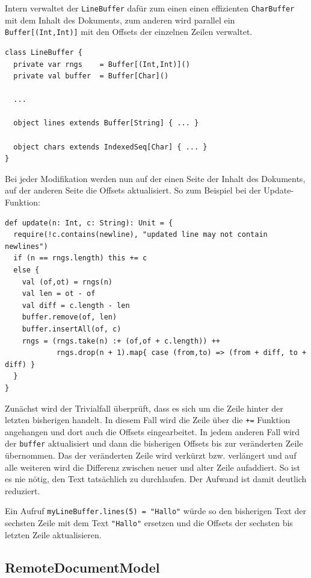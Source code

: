 Intern verwaltet der \texttt{LineBuffer} dafür zum einen einen effizienten \texttt{CharBuffer} mit
dem Inhalt des Dokuments, zum anderen wird parallel ein \texttt{Buffer[(Int,Int)]} mit den Offsets
der einzelnen Zeilen verwaltet.

\begin{lstlisting}
class LineBuffer {
  private var rngs    = Buffer[(Int,Int)]()  
  private val buffer  = Buffer[Char]()     

  ...
    
  object lines extends Buffer[String] { ... } 
  
  object chars extends IndexedSeq[Char] { ... } 
}
\end{lstlisting}

\clearpage

Bei jeder Modifikation werden nun auf der einen Seite der Inhalt des Dokuments, auf der anderen
Seite die Offsets aktualisiert. So zum Beispiel bei der Update-Funktion:

\begin{lstlisting}
def update(n: Int, c: String): Unit = {
  require(!c.contains(newline), "updated line may not contain newlines")
  if (n == rngs.length) this += c
  else {      
    val (of,ot) = rngs(n)
    val len = ot - of
    val diff = c.length - len
    buffer.remove(of, len)
    buffer.insertAll(of, c)
    rngs = (rngs.take(n) :+ (of,of + c.length)) ++ 
            rngs.drop(n + 1).map{ case (from,to) => (from + diff, to + diff) }
  }
}    
\end{lstlisting}

Zunächst wird der Trivialfall überprüft, dass es sich um die Zeile hinter der letzten bisherigen
handelt. In diesem Fall wird die Zeile über die \texttt{+=} Funktion angehangen und dort auch die
Offsets eingearbeitet. In jedem anderen Fall wird der \texttt{buffer} aktualisiert und dann die
bisherigen Offsets bis zur veränderten Zeile übernommen. Das der veränderten Zeile wird verkürzt
bzw. verlängert und auf alle weiteren wird die Differenz zwischen neuer und alter Zeile aufaddiert.
So ist es nie nötig, den Text tatsächlich zu durchlaufen. Der Aufwand ist damit deutlich reduziert.

Ein Aufruf \texttt{myLineBuffer.lines(5) = "Hallo"} würde so den bisherigen Text der sechsten Zeile
mit dem Text \texttt{"Hallo"} ersetzen und die Offsets der sechsten bis letzten Zeile aktualisieren.

\subsection{RemoteDocumentModel}

